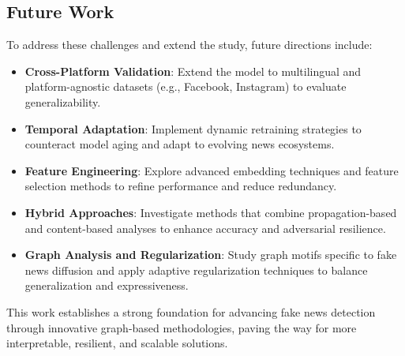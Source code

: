 \documentclass[sigconf,nonacm]{acmart}
\begin{document}
\subsection*{Future Work}
To address these challenges and extend the study, future directions include:
\begin{itemize}
    
    \item \textbf{Cross-Platform Validation}: Extend the model to multilingual and platform-agnostic datasets (e.g., Facebook, Instagram) to evaluate generalizability.
    \item \textbf{Temporal Adaptation}: Implement dynamic retraining strategies to counteract model aging and adapt to evolving news ecosystems.
    \item \textbf{Feature Engineering}: Explore advanced embedding techniques and feature selection methods to refine performance and reduce redundancy.
    \item \textbf{Hybrid Approaches}: Investigate methods that combine propagation-based and content-based analyses to enhance accuracy and adversarial resilience.
    \item \textbf{Graph Analysis and Regularization}: Study graph motifs specific to fake news diffusion and apply adaptive regularization techniques to balance generalization and expressiveness.

\end{itemize}

This work establishes a strong foundation for advancing fake news detection through innovative graph-based methodologies, paving the way for more interpretable, resilient, and scalable solutions.



\end{document}
